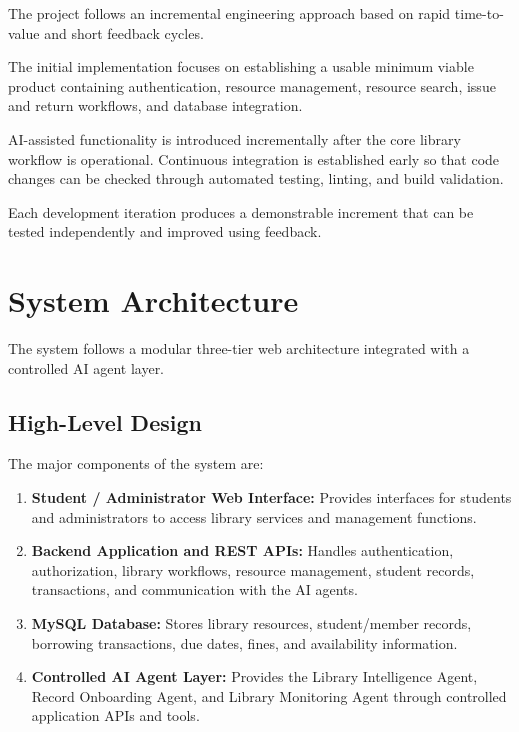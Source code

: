 \documentclass{tietreport}
\begin{document}
The project follows an incremental engineering approach based on rapid
time-to-value and short feedback cycles.

The initial implementation focuses on establishing a usable minimum viable
product containing authentication, resource management, resource search,
issue and return workflows, and database integration.

AI-assisted functionality is introduced incrementally after the core
library workflow is operational. Continuous integration is established
early so that code changes can be checked through automated testing,
linting, and build validation.

Each development iteration produces a demonstrable increment that can be
tested independently and improved using feedback.

\section{System Architecture}

The system follows a modular three-tier web architecture integrated with a
controlled AI agent layer.

\subsection{High-Level Design}

The major components of the system are:

\begin{enumerate}

    \item \textbf{Student / Administrator Web Interface:}
    Provides interfaces for students and administrators to access library
    services and management functions.

    \item \textbf{Backend Application and REST APIs:}
    Handles authentication, authorization, library workflows, resource
    management, student records, transactions, and communication with the
    AI agents.

    \item \textbf{MySQL Database:}
    Stores library resources, student/member records, borrowing
    transactions, due dates, fines, and availability information.

    \item \textbf{Controlled AI Agent Layer:}
    Provides the Library Intelligence Agent, Record Onboarding Agent, and
    Library Monitoring Agent through controlled application APIs and
    tools.

\end{enumerate}
\end{document}
